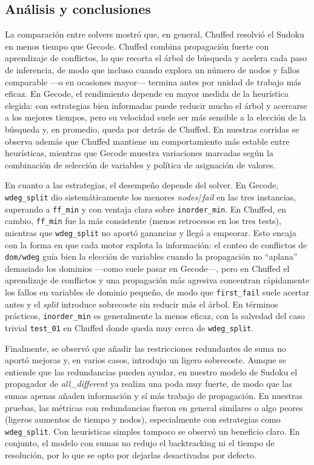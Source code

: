 
\subsection{Análisis y conclusiones}\label{sec:01-sudoku-analisis-y-conclusiones}
La comparación entre solvers mostró que, en general, Chuffed resolvió el Sudoku en menos tiempo que Gecode. Chuffed combina propagación fuerte con aprendizaje de conflictos, lo que recorta el árbol de búsqueda y acelera cada paso de inferencia, de modo que incluso cuando explora un número de nodos y fallos comparable —o en ocasiones mayor— termina antes por unidad de trabajo más eficaz. En Gecode, el rendimiento depende en mayor medida de la heurística elegida: con estrategias bien informadas puede reducir mucho el árbol y acercarse a los mejores tiempos, pero su velocidad suele ser más sensible a la elección de la búsqueda y, en promedio, queda por detrás de Chuffed. En nuestras corridas se observa además que Chuffed mantiene un comportamiento más estable entre heurísticas, mientras que Gecode muestra variaciones marcadas según la combinación de selección de variables y política de asignación de valores.

En cuanto a las estrategias, el desempeño depende del solver. En Gecode, \texttt{wdeg\_split} dio sistemáticamente los menores \emph{nodes}/\emph{fail} en las tres instancias, superando a \texttt{ff\_min} y con ventaja clara sobre \texttt{inorder\_min}. En Chuffed, en cambio, \texttt{ff\_min} fue la más consistente (menos retrocesos en los tres tests), mientras que \texttt{wdeg\_split} no aportó ganancias y llegó a empeorar. Esto encaja con la forma en que cada motor explota la información: el conteo de conflictos de \texttt{dom/wdeg} guía bien la elección de variables cuando la propagación no “aplana” demasiado los dominios —como suele pasar en Gecode—, pero en Chuffed el aprendizaje de conflictos y una propagación más agresiva concentran rápidamente los fallos en variables de dominio pequeño, de modo que \texttt{first\_fail} suele acertar antes y el \emph{split} introduce sobrecoste sin reducir más el árbol. En términos prácticos, \texttt{inorder\_min} es generalmente la menos eficaz, con la salvedad del caso trivial \texttt{test\_01} en Chuffed donde queda muy cerca de \texttt{wdeg\_split}.

Finalmente, se observó que añadir las restricciones redundantes de suma no aportó mejoras y, en varios casos, introdujo un ligero sobrecoste. Aunque se entiende que las redundancias pueden ayudar, en nuestro modelo de Sudoku el propagador de \textit{all\_different} ya realiza una poda muy fuerte, de modo que las sumas apenas añaden información y sí más trabajo de propagación. En nuestras pruebas, las métricas con redundancias fueron en general similares o algo peores (ligeros aumentos de tiempo y nodos), especialmente con estrategias como \texttt{wdeg\_split}. Con heurísticas simples tampoco se observó un beneficio claro. En conjunto, el modelo con sumas no redujo el backtracking ni el tiempo de resolución, por lo que se opto por dejarlas desactivadas por defecto.

